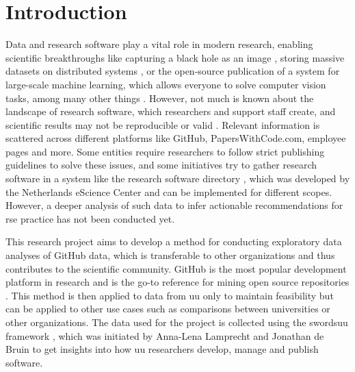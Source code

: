 \chapter{Introduction}
\label{chap:intro}
Data and research software play a vital role in modern research, enabling scientific breakthroughs like capturing a black hole as an image \cite{anzt_environment_2021, katz_overlap_2022}, storing massive datasets on distributed systems \cite{shvachko_hadoop_2010}, or the open-source publication of a system for large-scale machine learning, which allows everyone to solve computer vision tasks, among many other things \cite{TensorFlow}. However, not much is known about the landscape of research software, which researchers and support staff create, and scientific results may not be reproducible or valid \cite{allison_reproducibility_2016}. Relevant information is scattered across different platforms like GitHub, PapersWithCode.com, employee pages and more. Some entities require researchers to follow strict publishing guidelines to solve these issues, and some initiatives try to gather research software in a system like the research software directory \cite{spaaks_research_2020}, which was developed by the Netherlands eScience Center and can be implemented for different scopes. However, a deeper analysis of such data to infer actionable recommendations for \acrfull{rse} practice has not been conducted yet.


This research project aims to develop a method for conducting exploratory data analyses of GitHub data, which is transferable to other organizations and thus contributes to the scientific community. GitHub is the most popular development platform in research and is the go-to reference for mining open source repositories \cite{cosentino_systematic_2017}. This method is then applied to data from \acrfull{uu} only to maintain feasibility but can be applied to other use cases such as comparisons between universities or other organizations. The data used for the project is  collected using the \acrfull{swordsuu} framework \cite{de_Bruin_Scan_and_revieW_2021}, which was initiated by Anna-Lena Lamprecht and Jonathan de Bruin to get insights into how \acrshort{uu} researchers develop, manage and publish software.



